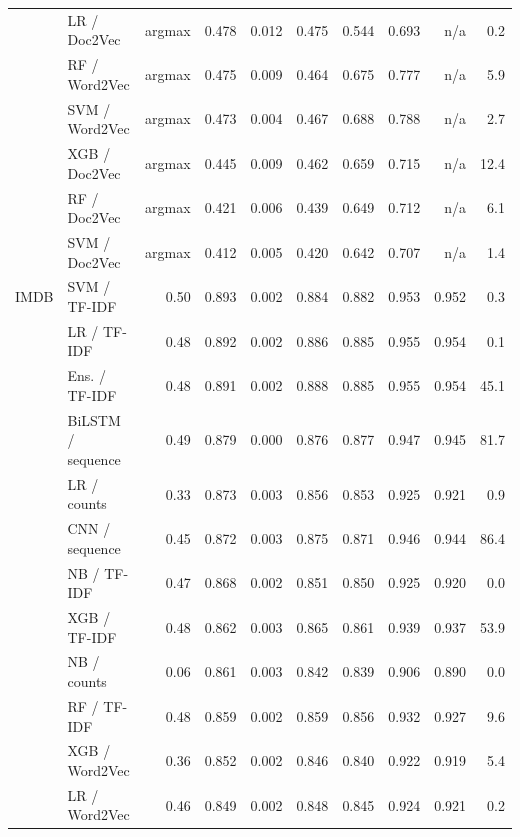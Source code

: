 \begin{longtable}{llrrrrrrrr}
 & LR / Doc2Vec & argmax & 0.478 & 0.012 & 0.475 & 0.544 & 0.693 & n/a & 0.2 \\
 & RF / Word2Vec & argmax & 0.475 & 0.009 & 0.464 & 0.675 & 0.777 & n/a & 5.9 \\
 & SVM / Word2Vec & argmax & 0.473 & 0.004 & 0.467 & 0.688 & 0.788 & n/a & 2.7 \\
 & XGB / Doc2Vec & argmax & 0.445 & 0.009 & 0.462 & 0.659 & 0.715 & n/a & 12.4 \\
 & RF / Doc2Vec & argmax & 0.421 & 0.006 & 0.439 & 0.649 & 0.712 & n/a & 6.1 \\
 & SVM / Doc2Vec & argmax & 0.412 & 0.005 & 0.420 & 0.642 & 0.707 & n/a & 1.4 \\
\midrule
IMDB & SVM / TF-IDF & 0.50 & 0.893 & 0.002 & 0.884 & 0.882 & 0.953 & 0.952 & 0.3 \\
 & LR / TF-IDF & 0.48 & 0.892 & 0.002 & 0.886 & 0.885 & 0.955 & 0.954 & 0.1 \\
 & Ens. / TF-IDF & 0.48 & 0.891 & 0.002 & 0.888 & 0.885 & 0.955 & 0.954 & 45.1 \\
 & BiLSTM / sequence & 0.49 & 0.879 & 0.000 & 0.876 & 0.877 & 0.947 & 0.945 & 81.7 \\
 & LR / counts & 0.33 & 0.873 & 0.003 & 0.856 & 0.853 & 0.925 & 0.921 & 0.9 \\
 & CNN / sequence & 0.45 & 0.872 & 0.003 & 0.875 & 0.871 & 0.946 & 0.944 & 86.4 \\
 & NB / TF-IDF & 0.47 & 0.868 & 0.002 & 0.851 & 0.850 & 0.925 & 0.920 & 0.0 \\
 & XGB / TF-IDF & 0.48 & 0.862 & 0.003 & 0.865 & 0.861 & 0.939 & 0.937 & 53.9 \\
 & NB / counts & 0.06 & 0.861 & 0.003 & 0.842 & 0.839 & 0.906 & 0.890 & 0.0 \\
 & RF / TF-IDF & 0.48 & 0.859 & 0.002 & 0.859 & 0.856 & 0.932 & 0.927 & 9.6 \\
 & XGB / Word2Vec & 0.36 & 0.852 & 0.002 & 0.846 & 0.840 & 0.922 & 0.919 & 5.4 \\
 & LR / Word2Vec & 0.46 & 0.849 & 0.002 & 0.848 & 0.845 & 0.924 & 0.921 & 0.2 \\
\end{longtable}